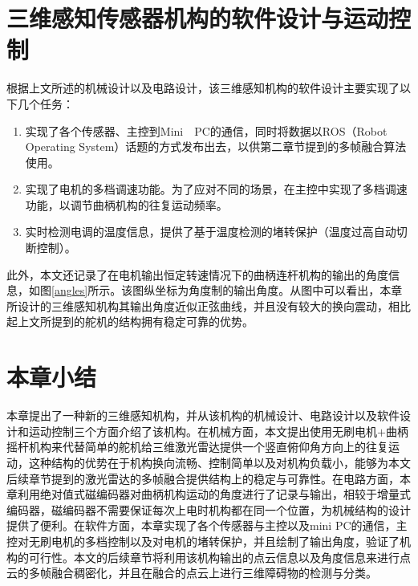 \section{三维感知传感器机构的软件设计与运动控制}

根据上文所述的机械设计以及电路设计，该三维感知机构的软件设计主要实现了以下几个任务：

\begin{enumerate}
    \item 实现了各个传感器、主控到Mini　PC的通信，同时将数据以ROS（Robot Operating System）话题的方式发布出去，以供第二章节提到的多帧融合算法使用。
    \item 实现了电机的多档调速功能。为了应对不同的场景，在主控中实现了多档调速功能，以调节曲柄机构的往复运动频率。
    \item 实时检测电调的温度信息，提供了基于温度检测的堵转保护（温度过高自动切断控制）。
\end{enumerate}

此外，本文还记录了在电机输出恒定转速情况下的曲柄连杆机构的输出的角度信息，如图\ref{angles}所示。该图纵坐标为角度制的输出角度。从图中可以看出，本章所设计的三维感知机构其输出角度近似正弦曲线，并且没有较大的换向震动，相比起上文所提到的舵机的结构拥有稳定可靠的优势。


\section{本章小结}

本章提出了一种新的三维感知机构，并从该机构的机械设计、电路设计以及软件设计和运动控制三个方面介绍了该机构。在机械方面，本文提出使用无刷电机$+$曲柄摇杆机构来代替简单的舵机给三维激光雷达提供一个竖直俯仰角方向上的往复运动，这种结构的优势在于机构换向流畅、控制简单以及对机构负载小，能够为本文后续章节提到的激光雷达的多帧融合提供结构上的稳定与可靠性。在电路方面，本章利用绝对值式磁编码器对曲柄机构运动的角度进行了记录与输出，相较于增量式编码器，磁编码器不需要保证每次上电时机构都在同一个位置，为机械结构的设计提供了便利。在软件方面，本章实现了各个传感器与主控以及mini PC的通信，主控对无刷电机的多档控制以及对电机的堵转保护，并且绘制了输出角度，验证了机构的可行性。本文的后续章节将利用该机构输出的点云信息以及角度信息来进行点云的多帧融合稠密化，并且在融合的点云上进行三维障碍物的检测与分类。